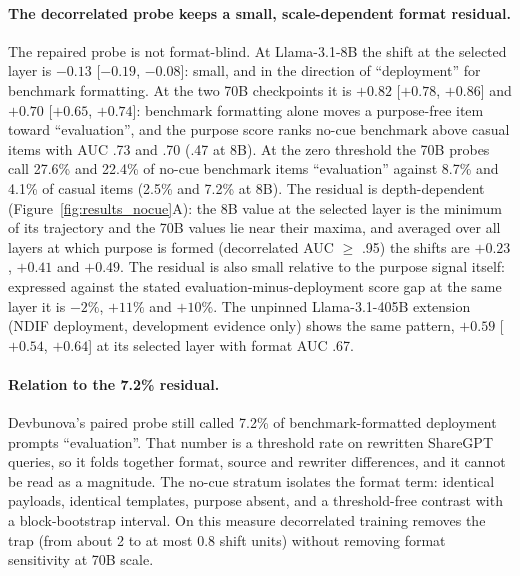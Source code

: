 \paragraph{The decorrelated probe keeps a small, scale-dependent format residual.}
The repaired probe is not format-blind. At Llama-3.1-8B the shift at the
selected layer is $-0.13$ [$-0.19$, $-0.08$]: small, and in the direction of
``deployment'' for benchmark formatting. At the two 70B checkpoints it is
$+0.82$ [$+0.78$, $+0.86$] and $+0.70$ [$+0.65$, $+0.74$]: benchmark formatting
alone moves a purpose-free item toward ``evaluation'', and the purpose score
ranks no-cue benchmark above casual items with AUC .73 and .70 (.47 at 8B).
At the zero threshold the 70B probes call 27.6\% and 22.4\% of no-cue
benchmark items ``evaluation'' against 8.7\% and 4.1\% of casual items (2.5\%
and 7.2\% at 8B). The residual is depth-dependent
(Figure~\ref{fig:results_nocue}A): the 8B value at the selected layer is the
minimum of its trajectory and the 70B values lie near their maxima, and
averaged over all layers at which purpose is formed (decorrelated AUC $\geq$
.95) the shifts are $+0.23$, $+0.41$ and $+0.49$. The residual is also small
relative to the purpose signal itself: expressed against the stated
evaluation-minus-deployment score gap at the same layer it is $-2\%$, $+11\%$
and $+10\%$. The unpinned Llama-3.1-405B extension (NDIF deployment,
development evidence only) shows the same pattern, $+0.59$ [$+0.54$, $+0.64$]
at its selected layer with format AUC .67.

\paragraph{Relation to the 7.2\% residual.}
Devbunova's paired probe still called 7.2\% of benchmark-formatted deployment
prompts ``evaluation''. That number is a threshold rate on rewritten ShareGPT
queries, so it folds together format, source and rewriter differences, and it
cannot be read as a magnitude. The no-cue stratum isolates the format term:
identical payloads, identical templates, purpose absent, and a threshold-free
contrast with a block-bootstrap interval. On this measure decorrelated
training removes the trap (from about 2 to at most 0.8 shift units) without
removing format sensitivity at 70B scale.

